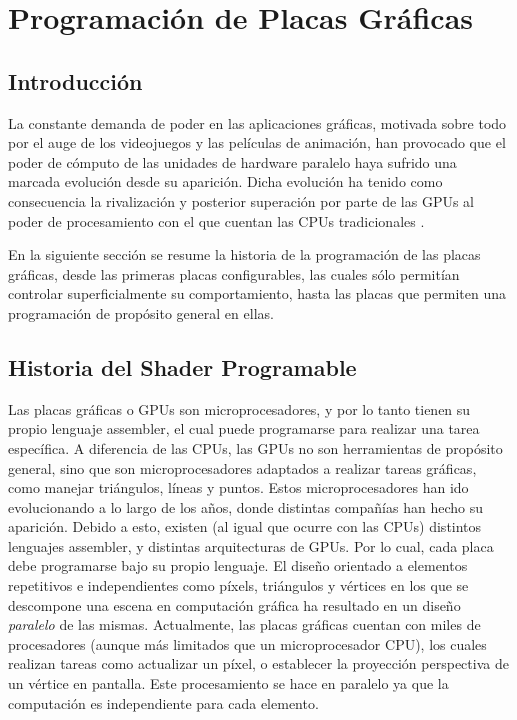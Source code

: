 \chapter{Programación de Placas Gráficas}

\section{Introducci\'on}
La constante demanda de poder en las aplicaciones gr\'aficas, motivada sobre todo por el auge de los videojuegos y las películas de animación, han provocado que el poder de cómputo de las unidades de hardware paralelo haya sufrido una marcada evoluci\'on desde su aparici\'on.
Dicha evoluci\'on ha tenido como consecuencia la rivalizaci\'on y posterior superaci\'on por parte de las GPUs al poder de procesamiento con el que cuentan las CPUs tradicionales \cite{Harris06}.

En la siguiente sección se resume la historia de la programación de las placas gráficas, desde las primeras placas configurables, las cuales sólo permitían controlar superficialmente su comportamiento, hasta las placas que permiten una programación de propósito general en ellas.

\section{Historia del Shader Programable}
Las placas gráficas o GPUs son microprocesadores, y por lo tanto tienen su propio lenguaje assembler, el cual puede programarse para realizar una tarea específica.
A diferencia de las CPUs, las GPUs no son herramientas de propósito general, sino que son microprocesadores adaptados a realizar tareas gráficas, como manejar triángulos, líneas y puntos.
Estos microprocesadores han ido evolucionando a lo largo de los años, donde distintas compañías han hecho su aparición.
Debido a esto, existen (al igual que ocurre con las CPUs) distintos lenguajes assembler, y distintas arquitecturas de GPUs.
Por lo cual, cada placa debe programarse bajo su propio lenguaje.
El diseño orientado a elementos repetitivos e independientes como píxels, triángulos y vértices en los que se descompone una escena en computación gráfica ha resultado en un diseño {\em paralelo} de las mismas.
Actualmente, las placas gráficas cuentan con miles de procesadores (aunque más limitados que un microprocesador CPU), los cuales realizan tareas como actualizar un píxel, o establecer la proyección perspectiva de un vértice en pantalla.
Este procesamiento se hace en paralelo ya que la computación es independiente para cada elemento.

